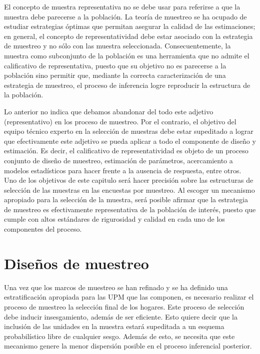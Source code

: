\documentclass[
  10pt,
  spanish,
]{book}
\begin{document}
El concepto de muestra representativa no se debe usar para referirse a que la muestra debe parecerse a la población. La teoría de muestreo se ha ocupado de estudiar estrategias óptimas que permitan asegurar la calidad de las estimaciones; en general, el concepto de representatividad debe estar asociado con la estrategia de muestreo y no sólo con las muestra seleccionada. Consecuentemente, la muestra como subconjunto de la población es una herramienta que no admite el calificativo de representativa, puesto que su objetivo no es parecerse a la población sino permitir que, mediante la correcta caracterización de una estrategia de muestreo, el proceso de inferencia logre reproducir la estructura de la población.

Lo anterior no indica que debamos abandonar del todo este adjetivo (representativo) en los proceso de muestreo. Por el contrario, el objetivo del equipo técnico experto en la selección de muestras debe estar supeditado a lograr que efectivamente este adjetivo se pueda aplicar a todo el componente de diseño y estimación. Es decir, el calificativo de representatividad es objeto de un proceso conjunto de diseño de muestreo, estimación de parámetros, acercamiento a modelos estadísticos para hacer frente a la ausencia de respuesta, entre otros. Uno de los objetivos de este capitulo será hacer precisión sobre las estructuras de selección de las muestras en las encuestas por muestreo. Al escoger un mecanismo apropiado para la selección de la muestra, será posible afirmar que la estrategia de muestreo es efectivamente representativa de la población de interés, puesto que cumple con altos estándares de rigurosidad y calidad en cada uno de los componentes del proceso.

\hypertarget{diseuxf1os-de-muestreo}{%
\section{Diseños de muestreo}\label{diseuxf1os-de-muestreo}}

Una vez que los marcos de muestreo se han refinado y se ha definido una estratificación apropiada para las UPM que las componen, es necesario realizar el proceso de muestreo la selección final de los hogares. Este proceso de selección debe inducir insesgamiento, además de ser eficiente. Esto quiere decir que la inclusión de las unidades en la muestra estará supeditada a un esquema probabilístico libre de cualquier sesgo. Además de esto, se necesita que este mecanismo genere la menor dispersión posible en el proceso inferencial posterior.
\end{document}
